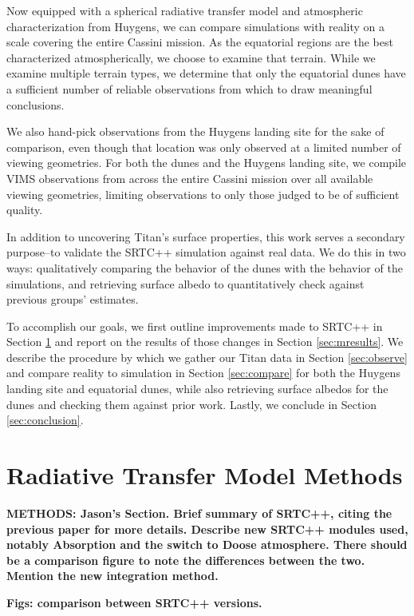 \documentclass[twocolumn,linenumbers]{aastex631}
\begin{document}
Now equipped with a spherical radiative transfer model and atmospheric characterization from Huygens, we can compare simulations with reality on a scale covering the entire Cassini mission. As the equatorial regions are the best characterized atmospherically, we choose to examine that terrain. While we examine multiple terrain types, we determine that only the equatorial dunes have a sufficient number of reliable observations from which to draw meaningful conclusions.

We also hand-pick observations from the Huygens landing site for the sake of comparison, even though that location was only observed at a limited number of viewing geometries. For both the dunes and the Huygens landing site, we compile VIMS observations from across the entire Cassini mission over all available viewing geometries, limiting observations to only those judged to be of sufficient quality.

In addition to uncovering Titan's surface properties, this work serves a secondary purpose--to validate the SRTC++ simulation against real data. We do this in two ways: qualitatively comparing the behavior of the dunes with the behavior of the simulations, and retrieving surface albedo to quantitatively check against previous groups' estimates.

To accomplish our goals, we first outline improvements made to SRTC++ in Section \ref{sec:model} and report on the results of those changes in Section \ref{sec:mresults}. We describe the procedure by which we gather our Titan data in Section \ref{sec:observe} and compare reality to simulation in Section \ref{sec:compare} for both the Huygens landing site and equatorial dunes, while also retrieving surface albedos for the dunes and checking them against prior work. Lastly, we conclude in Section \ref{sec:conclusion}.

\section{Radiative Transfer Model Methods} \label{sec:model}

\textbf{\color{blue}METHODS: Jason's Section. Brief summary of SRTC++, citing the previous paper for more details. Describe new SRTC++ modules used, notably Absorption and the switch to Doose atmosphere. There should be a comparison figure to note the differences between the two. Mention the new integration method.\color{black}}

\textbf{\color{blue}Figs: comparison between SRTC++ versions.\color{black}}
\end{document}
